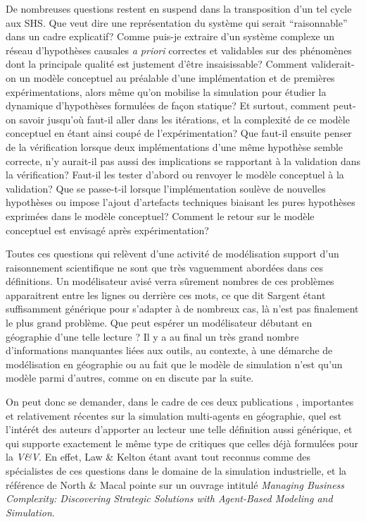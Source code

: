 De nombreuses questions restent en suspend dans la transposition d'un tel cycle aux SHS. Que veut dire une représentation du système qui serait \enquote{raisonnable} dans un cadre explicatif? Comme puis-je extraire d'un système complexe un réseau d'hypothèses causales \textit{a priori} correctes et validables sur des phénomènes dont la principale qualité est justement d'être insaisissable? Comment validerait-on un modèle conceptuel au préalable d'une implémentation et de premières expérimentations, alors même qu'on mobilise la simulation pour étudier la dynamique d'hypothèses formulées de façon statique? Et surtout, comment peut-on savoir jusqu'où faut-il aller dans les itérations, et la complexité de ce modèle conceptuel en étant ainsi coupé de l'expérimentation? Que faut-il ensuite penser de la vérification lorsque deux implémentations d'une même hypothèse semble correcte, n'y aurait-il pas aussi des implications se rapportant à la validation dans la vérification? Faut-il les tester d'abord ou renvoyer le modèle conceptuel à la validation? Que se passe-t-il lorsque l'implémentation soulève de nouvelles hypothèses ou impose l'ajout d'artefacts techniques biaisant les pures hypothèses exprimées dans le modèle conceptuel? Comment le retour sur le modèle conceptuel est envisagé après expérimentation?

Toutes ces questions qui relèvent d'une activité de modélisation support d'un raisonnement scientifique ne sont que très vaguemment abordées dans ces définitions. Un modélisateur avisé verra sûrement nombres de ces problèmes apparaitrent entre les lignes ou derrière ces mots, ce que dit Sargent étant suffisamment générique pour s'adapter à de nombreux cas, là n'est pas finalement le plus grand problème. Que peut espérer un modélisateur débutant en géographie d'une telle lecture ? Il y a au final un très grand nombre d'informations manquantes liées aux outils, au contexte, à une démarche de modélisation en géographie ou au fait que le modèle de simulation n'est qu'un modèle parmi d'autres, comme on en discute par la suite.

On peut donc se demander, dans le cadre de ces deux publications \autocite{Crooks2008,Crooks2012}, importantes et relativement récentes sur la simulation multi-agents en géographie, quel est l'intérét des auteurs d'apporter au lecteur une telle définition aussi générique, et qui supporte exactement le même type de critiques que celles déjà formulées pour la \textit{V\&V}. En effet, Law \& Kelton étant avant tout reconnus comme des spécialistes de ces questions dans le domaine de la simulation industrielle, et la référence de North \& Macal pointe sur un ouvrage intitulé \textit{Managing Business Complexity: Discovering Strategic Solutions with Agent-Based Modeling and Simulation}.

